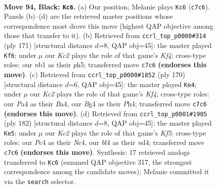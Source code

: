 \documentclass[11pt]{article}
\begin{document}
\clearpage

\begin{figure}[p]\centering
\begin{subfigure}{0.46\textwidth}\centering
\resizebox{\linewidth}{!}{%
\newchessgame
\chessboard[
  setfen={8/2k5/8/8/p1p2Bb1/8/5K2/1N6 b - - 43 94},
  showmover=false,
  pgfstyle=straightmove, color=movearrow, markmove={c7-c6}
]}
\caption{}
\end{subfigure}\hfill
\begin{subfigure}{0.46\textwidth}\centering
\resizebox{\linewidth}{!}{%
\newchessgame
\chessboard[
  setfen={8/3B4/7p/5k1P/7b/5K2/8/8 b - - 1 86},
  showmover=false,
  pgfstyle=straightmove, color=movearrow, markmove={f5-f6}
]}
\caption{}
\end{subfigure}
\\[4pt]
\begin{subfigure}{0.46\textwidth}\centering
\resizebox{\linewidth}{!}{%
\newchessgame
\chessboard[
  setfen={8/8/3p1k2/3P4/B4K1P/8/3b4/8 w - - 12 86},
  showmover=false,
  pgfstyle=straightmove, color=movearrow, markmove={f4-e4}
]}
\caption{}
\end{subfigure}\hfill
\begin{subfigure}{0.46\textwidth}\centering
\resizebox{\linewidth}{!}{%
\newchessgame
\chessboard[
  setfen={8/5k2/8/5K1P/2Nn4/7P/8/8 w - - 15 92},
  showmover=false,
  pgfstyle=straightmove, color=movearrow, markmove={f5-e5}
]}
\caption{}
\end{subfigure}
\caption{\textbf{Move 94, Black: \texttt{Kc6}.} (a) Our position; Melanie plays \texttt{Kc6} (\texttt{c7c6}). Panels (b)--(d) are the retrieved master positions whose correspondence most drove this move (highest QAP objective among those that transfer to it). (b) Retrieved from \texttt{ccrl\_top\_p0000\#314} (ply 171) [structural distance $d$=8, QAP obj=45]: the master played \texttt{Kf6}; under $\mu$ our \emph{Kc2} plays the role of that game's \emph{Kf4}; cross-type roles: our \emph{n}b1 as their \emph{p}h5; transferred move \texttt{c7c6} \textbf{(endorses this move)}. (c) Retrieved from \texttt{ccrl\_top\_p0000\#1852} (ply 170) [structural distance $d$=6, QAP obj=45]: the master played \texttt{Ke4}; under $\mu$ our \emph{Kc2} plays the role of that game's \emph{Kf4}; cross-type roles: our \emph{P}a4 as their \emph{B}a4, our \emph{B}g4 as their \emph{P}h4; transferred move \texttt{c7c6} \textbf{(endorses this move)}. (d) Retrieved from \texttt{ccrl\_top\_p0001\#1905} (ply 182) [structural distance $d$=8, QAP obj=45]: the master played \texttt{Ke5}; under $\mu$ our \emph{Kc2} plays the role of that game's \emph{Kf5}; cross-type roles: our \emph{P}c4 as their \emph{N}c4, our \emph{b}f4 as their \emph{n}d4; transferred move \texttt{c7c6} \textbf{(endorses this move)}. Synthesis: 17 retrieved analogs transferred to \texttt{Kc6} (summed QAP objective 317, the strongest correspondence among the candidate moves); Melanie committed it via the \texttt{search} selector.}
\label{fig:thought-m187}
\end{figure}
\end{document}
